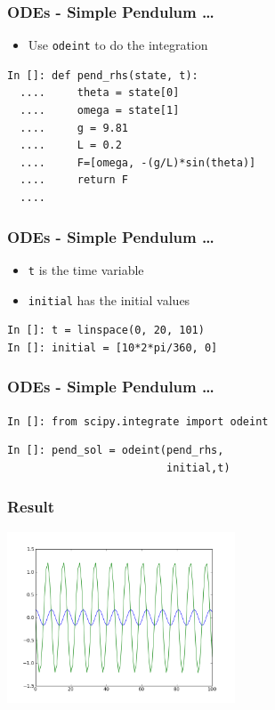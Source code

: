 \documentclass[14pt,compress]{beamer}
\newcounter{time}
\newcommand{\inctime}[1]{\addtocounter{time}{#1}{\tiny \thetime\ m}}
\newcommand{\typ}[1]{\lstinline{#1}}
\begin{document}
\begin{frame}[fragile]
\frametitle{ODEs - Simple Pendulum \ldots}
\begin{itemize}
\item Use \typ{odeint} to do the integration
\end{itemize}
\begin{lstlisting}
In []: def pend_rhs(state, t):
  ....     theta = state[0]
  ....     omega = state[1]
  ....     g = 9.81
  ....     L = 0.2
  ....     F=[omega, -(g/L)*sin(theta)]
  ....     return F
  ....
\end{lstlisting}
\end{frame}

\begin{frame}[fragile]
\frametitle{ODEs - Simple Pendulum \ldots}
\begin{itemize}
\item \typ{t} is the time variable \\
\item \typ{initial} has the initial values
\end{itemize}
\begin{lstlisting}
In []: t = linspace(0, 20, 101)
In []: initial = [10*2*pi/360, 0]
\end{lstlisting}
\end{frame}

\begin{frame}[fragile]
\frametitle{ODEs - Simple Pendulum \ldots}
\typ{In []: from scipy.integrate import odeint}
\begin{lstlisting}
In []: pend_sol = odeint(pend_rhs,
                         initial,t)
\end{lstlisting}
\end{frame}

\begin{frame}[fragile]
\frametitle{Result}
\begin{center}
\includegraphics[height=2in, interpolate=true]{data/ode}
\end{center}
  \inctime{10}
\end{frame}
\end{document}
